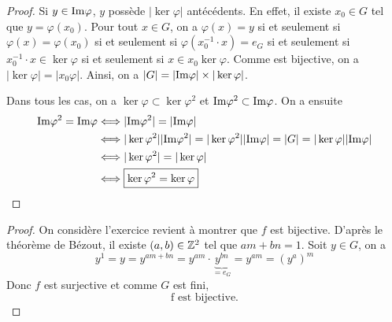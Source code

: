 \begin{proof}
	Si $y\in \mathrm{Im}\varphi$, $y$ possède $\vert\ker\varphi\vert$ antécédents. En effet, il existe $x_{0}\in G$ tel que $y=\varphi(x_{0})$. Pour tout $x\in G$, on a $\varphi(x)=y$ si et seulement si $\varphi(x)=\varphi(x_{0})$ si et seulement si $\varphi(x_{0}^{-1}\cdot x)=e_{G}$ si et seulement si $x_{0}^{-1}\cdot x\in\ker\varphi$ si et seulement si $x\in x_{0}\ker\varphi$. Comme 
	est bijective, on a $\vert\ker\varphi\vert=\vert x_{0}\varphi\vert$. Ainsi, on a $\vert G\vert=\vert\mathrm{Im}\varphi\vert\times\vert\ker\varphi\vert$.

	Dans tous les cas, on a $\ker\varphi\subset\ker\varphi^{2}$ et $\mathrm{Im}\varphi^{2}\subset\mathrm{Im}\varphi$. On a ensuite 
	\begin{align}
		\mathrm{Im}\varphi^{2}=\mathrm{Im}\varphi
		&\Longleftrightarrow \vert\mathrm{Im}\varphi^{2}\vert=\vert\mathrm{Im}\varphi\vert\\
		&\Longleftrightarrow \vert\ker\varphi^{2}\vert\vert\mathrm{Im}\varphi^{2}\vert=\vert\ker\varphi^{2}\vert\vert\mathrm{Im}\varphi\vert=\vert G\vert=\vert\ker\varphi\vert\vert\mathrm{Im}\varphi\vert\\
		&\Longleftrightarrow \vert\ker\varphi^{2}\vert=\vert\ker\varphi\vert\\
		&\Longleftrightarrow \boxed{\ker\varphi^{2}=\ker\varphi}
	\end{align}
\end{proof}

\begin{proof}
	On considère 
	l'exercice revient à montrer que $f$ est bijective. D'après le théorème de Bézout, il existe $(a,b)\in\mathbb{Z}^{2}$ tel que $am+bn=1$. Soit $y\in G$, on a 
	\begin{equation}
		y^{1}=y=y^{am+bn}=y^{am}\cdot \underbrace{y^{bn}}_{=e_{G}}=y^{am}=(y^{a})^{m}
	\end{equation}
	Donc $f$ est surjective et comme $G$ est fini, 
	\begin{equation}
		\boxed{\text{f est bijective.}}
	\end{equation}
\end{proof}

